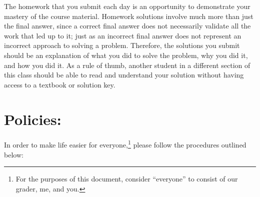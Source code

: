 \noindent The homework that you submit each day is an opportunity to demonstrate your mastery
of the course material. 
Homework solutions involve much more than just the final answer, since a correct final
answer does not necessarily validate all the work that led up to it; just as an incorrect final answer
does not represent an incorrect approach to solving a problem.
Therefore, the solutions you submit %
should be an explanation of what you did to solve the problem, why you did it, and how you
did it. As a rule of thumb, another student in a different section of this class should be able to read
and understand your solution without having access to a textbook or solution key.\\




\vspace*{-.2in}
\section*{Policies:}

In order to make life easier for everyone,\footnote{For the purposes of this document, consider ``everyone'' to consist of our grader, me, and you.} please follow the procedures outlined below:  %

